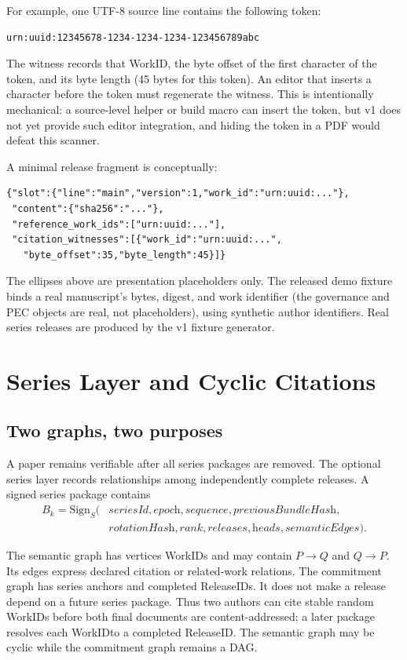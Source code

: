 \documentclass[11pt]{article}
\newcommand{\workid}{\textsf{WorkID}}
\newcommand{\releaseid}{\textsf{ReleaseID}}
\begin{document}
For example, one UTF-8 source line contains the following token:
\begin{verbatim}
urn:uuid:12345678-1234-1234-1234-123456789abc
\end{verbatim}
The witness records that WorkID, the byte offset of the first character of the
token, and its byte length (45 bytes for this token). An editor that inserts a
character before the token must regenerate the witness. This is intentionally
mechanical: a source-level helper or build macro can insert the token, but v1
does not yet provide such editor integration, and hiding the token in a PDF
would defeat this scanner.

A minimal release fragment is conceptually:
\begin{verbatim}
{"slot":{"line":"main","version":1,"work_id":"urn:uuid:..."},
 "content":{"sha256":"..."},
 "reference_work_ids":["urn:uuid:..."],
 "citation_witnesses":[{"work_id":"urn:uuid:...",
   "byte_offset":35,"byte_length":45}]}
\end{verbatim}
The ellipses above are presentation placeholders only. The released demo
fixture binds a real manuscript's bytes, digest, and work identifier (the
governance and PEC objects are real, not placeholders), using synthetic author
identifiers. Real series releases are produced by the v1 fixture generator.

\section{Series Layer and Cyclic Citations}

\subsection{Two graphs, two purposes}

A paper remains verifiable after all series packages are removed. The optional series layer records relationships among independently complete releases. A signed series package contains
\[
\begin{aligned}
  B_k = \mathrm{Sign}_{S}(&\textit{seriesId},\textit{epoch},\textit{sequence},\textit{previousBundleHash},\\
                           &\textit{rotationHash},\textit{rank},\textit{releases},\textit{heads},\textit{semanticEdges}).
\end{aligned}
\]

The semantic graph has vertices \workid s and may contain $P \rightarrow Q$ and $Q \rightarrow P$. Its edges express declared citation or related-work relations. The commitment graph has series anchors and completed \releaseid s. It does not make a release depend on a future series package. Thus two authors can cite stable random \workid s before both final documents are content-addressed; a later package resolves each \workid to a completed \releaseid. The semantic graph may be cyclic while the commitment graph remains a DAG.
\end{document}
